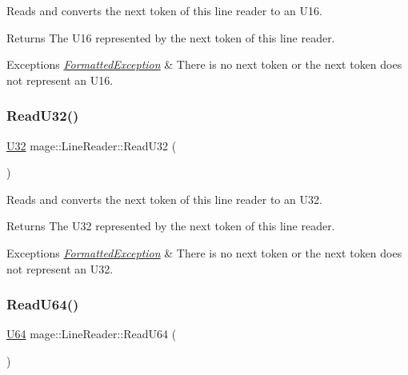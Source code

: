 Reads and converts the next token of this line reader to an {\ttfamily U16}.

\begin{DoxyReturn}{Returns}
The {\ttfamily U16} represented by the next token of this line reader. 
\end{DoxyReturn}

\begin{DoxyExceptions}{Exceptions}
{\em \hyperlink{classmage_1_1_formatted_exception}{Formatted\+Exception}} & There is no next token or the next token does not represent an {\ttfamily U16}. \\
\hline
\end{DoxyExceptions}
\hypertarget{classmage_1_1_line_reader_a16e9bd6846cc8e90182582e67c41af4f}{}\label{classmage_1_1_line_reader_a16e9bd6846cc8e90182582e67c41af4f} 
\subsubsection{\texorpdfstring{Read\+U32()}{ReadU32()}}
{\footnotesize\ttfamily \hyperlink{namespacemage_a41c104c036fba3756a74e19f793eeaa1}{U32} mage\+::\+Line\+Reader\+::\+Read\+U32 (\begin{DoxyParamCaption}{ }\end{DoxyParamCaption})\hspace{0.3cm}{\ttfamily [protected]}}

Reads and converts the next token of this line reader to an {\ttfamily U32}.

\begin{DoxyReturn}{Returns}
The {\ttfamily U32} represented by the next token of this line reader. 
\end{DoxyReturn}

\begin{DoxyExceptions}{Exceptions}
{\em \hyperlink{classmage_1_1_formatted_exception}{Formatted\+Exception}} & There is no next token or the next token does not represent an {\ttfamily U32}. \\
\hline
\end{DoxyExceptions}
\hypertarget{classmage_1_1_line_reader_aa8866c69c282910527a2453ac80bf00f}{}\label{classmage_1_1_line_reader_aa8866c69c282910527a2453ac80bf00f} 
\subsubsection{\texorpdfstring{Read\+U64()}{ReadU64()}}
{\footnotesize\ttfamily \hyperlink{namespacemage_a6672cf3c861707ce4a3235a3eb43941d}{U64} mage\+::\+Line\+Reader\+::\+Read\+U64 (\begin{DoxyParamCaption}{ }\end{DoxyParamCaption})\hspace{0.3cm}{\ttfamily [protected]}}

